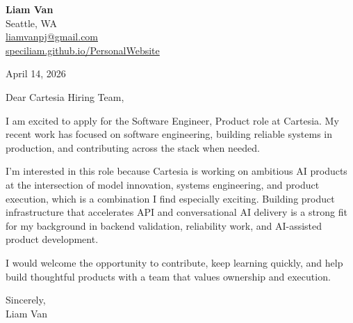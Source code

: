 \documentclass[letterpaper,11pt]{article}
\begin{document}
\begin{flushleft}
\textbf{\Large Liam Van} \\
Seattle, WA \\
\href{mailto:liamvanpj@gmail.com}{liamvanpj@gmail.com} \\
\href{https://speciliam.github.io/PersonalWebsite}{speciliam.github.io/PersonalWebsite}
\end{flushleft}

April 14, 2026

\noindent Dear Cartesia Hiring Team,

\noindent I am excited to apply for the Software Engineer, Product role at Cartesia. My recent work has focused on software engineering, building reliable systems in production, and contributing across the stack when needed.

\noindent I'm interested in this role because Cartesia is working on ambitious AI products at the intersection of model innovation, systems engineering, and product execution, which is a combination I find especially exciting. Building product infrastructure that accelerates API and conversational AI delivery is a strong fit for my background in backend validation, reliability work, and AI-assisted product development.

\noindent I would welcome the opportunity to contribute, keep learning quickly, and help build thoughtful products with a team that values ownership and execution.

\noindent Sincerely, \\
Liam Van
\end{document}
